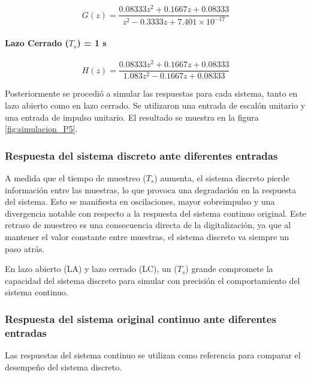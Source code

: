 \documentclass[journal]{IEEEtran}
\begin{document}
$$G(z) = \frac{0.08333 z^2 + 0.1667 z + 0.08333}{z^2 - 0.3333 z + 7.401 \times 10^{-17}}$$

\paragraph{Lazo Cerrado ($T_s$) = 1 s}

$$H(z) = \frac{0.08333 z^2 + 0.1667 z + 0.08333}{1.083 z^2 - 0.1667 z + 0.08333}$$


Posteriormente se procedió a simular las respuestas para cada sistema, tanto en lazo abierto como en lazo cerrado. Se utilizaron una entrada de escalón unitario y una entrada de impulso unitario.
El resultado se muestra en la figura \ref{fig:simulacion_P5}.

\subsubsection{\textbf{Respuesta del sistema discreto ante diferentes entradas}}

A medida que el tiempo de muestreo ($T_s$) aumenta, el sistema discreto pierde información entre las muestras, lo que provoca una degradación en la respuesta del sistema. Esto se manifiesta en oscilaciones, mayor sobreimpulso y una divergencia notable con respecto a la respuesta del sistema continuo original.  Este retraso de muestreo es una consecuencia directa de la digitalización, ya que al mantener el valor constante entre muestras, el sistema discreto va siempre un paso atrás.

En lazo abierto (LA) y lazo cerrado (LC), un ($T_s$) grande compromete la capacidad del sistema discreto para simular con precisión el comportamiento del sistema continuo.

\subsubsection{\textbf{Respuesta del sistema original continuo ante diferentes entradas}}

Las respuestas del sistema continuo se utilizan como referencia para comparar el desempeño del sistema discreto. 
\end{document}

